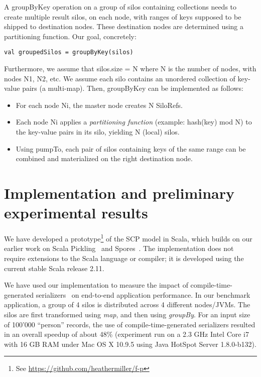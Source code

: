 \documentclass{easychair}
\begin{document}
A groupByKey operation on a group of silos containing collections needs to create multiple result silos, on each node, with ranges of keys supposed to be shipped to destination nodes. These destination nodes are determined using a partitioning function. Our goal, concretely:
\begin{verbatim}
val groupedSilos = groupByKey(silos)
\end{verbatim}
\noindent
Furthermore, we assume that silos.size = N where N is the number of nodes,
with nodes N1, N2, etc. We assume each silo contains an unordered collection
of key-value pairs (a multi-map). Then, groupByKey can be implemented as
follows:
\begin{itemize}
\item For each node Ni, the master node creates N SiloRefs.
\item Each node Ni applies a \emph{partitioning function} (example: hash(key) mod N) to
      the key-value pairs in its silo, yielding N (local) silos.
\item Using pumpTo, each pair of silos containing keys of the same range can be combined
      and materialized on the right destination node.
\end{itemize}



\section{Implementation and preliminary experimental results}
\label{sec:impl}

We have developed a prototype\footnote{See \url{https://github.com/heathermiller/f-p}}
of the SCP model in Scala, which builds on our earlier work on
Scala Pickling~\cite{MillerHBO13} and Spores~\cite{MillerHO14}.
The implementation does not require extensions to the Scala language or compiler; it
is developed using the current stable Scala release 2.11.

We have used our implementation to measure the impact of
compile-time-generated serializers~\cite{MillerHBO13} on end-to-end application
performance. In our benchmark application, a group of 4 silos is distributed
across 4 different nodes/JVMs. The silos are first transformed using
\emph{map}, and then using \emph{groupBy}. For an input size of 100'000 ``person''
records, the use of compile-time-generated serializers resulted in
an overall speedup of about 48\% (experiment run on a 2.3 GHz Intel Core i7
with 16 GB RAM under Mac OS X 10.9.5 using Java HotSpot Server 1.8.0-b132).
\end{document}
